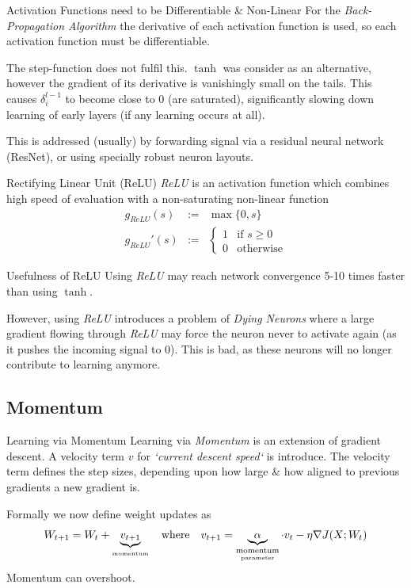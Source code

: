\documentclass[11pt,a4paper]{article}
\begin{document}
\begin{remark}{Activation Functions need to be Differentiable \& Non-Linear}
  For the \textit{Back-Propagation Algorithm} the derivative of each activation function is used, so each activation function must be differentiable.
  \par The step-function does not fulfil this. $\tanh$ was consider as an alternative, however the gradient of its derivative is vanishingly small on the tails. This causes $\delta_i^{l-1}$ to become close to 0 (are saturated), significantly slowing down learning of early layers (if any learning occurs at all).
  \par This is addressed (usually) by forwarding signal via a residual neural network (ResNet), or using specially robust neuron layouts.
\end{remark}

\begin{definition}{Rectifying Linear Unit (ReLU)}
  \textit{ReLU} is an activation function which combines high speed of evaluation with a non-saturating non-linear function
  \[\begin{array}{rcl}
      g_{ReLU}(s)&:=&\max\{0,s\}\\
      g_{ReLU}'(s)&:=&\begin{cases}1&\text{if }s\geq0\\0&\text{otherwise}\end{cases}
  \end{array}\]
\end{definition}

\begin{remark}{Usefulness of ReLU}
  Using \textit{ReLU} may reach network convergence 5-10 times faster than using $\tanh$.
  \par However, using \textit{ReLU} introduces a problem of \textit{Dying Neurons} where a large gradient flowing through \textit{ReLU} may force the neuron never to activate again (as it pushes the incoming signal to 0). This is bad, as these neurons will no longer contribute to learning anymore.
\end{remark}

\subsection{Momentum}

\begin{proposition}{Learning via Momentum}
  Learning via \textit{Momentum} is an extension of gradient descent. A velocity term $v$ for \textit{`current descent speed`} is introduce. The velocity term defines the step sizes, depending upon how large \& how aligned to previous gradients a new gradient is.
  \par Formally we now define weight updates as
  \[ W_{t+1}=W_t+\underbrace{v_{t+1}}_\text{\tiny momentum}\quad\text{where}\quad v_{t+1}=\underbrace{\alpha}_{ \underset{\text{parameter}}{\text{momentum}}}\cdot v_t-\eta\nabla J(X;W_t) \]
  Momentum can overshoot.
\end{proposition}
\end{document}
